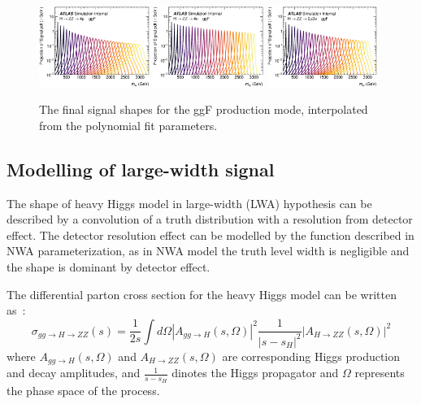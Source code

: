 \begin{figure}[htbp]
    \centering
    \includegraphics[width=0.32\textwidth]{figures/HMHZZ/signal/NWA//ggf_multipeakplot_4mu.eps}
    \includegraphics[width=0.32\textwidth]{figures/HMHZZ/signal/NWA//ggf_multipeakplot_4e.eps}
    \includegraphics[width=0.32\textwidth]{figures/HMHZZ/signal/NWA//ggf_multipeakplot_2mu2e.eps}
    \caption{The final signal shapes for the ggF production mode, interpolated from the polynomial fit parameters.}
    \label{fig:ggf_multipeak}
\end{figure}


\subsection{Modelling of large-width signal}
\label{sec:signal_lwa}

The \mfl shape of heavy Higgs model in large-width (LWA) hypothesis can be described by a convolution of a truth distribution with a resolution from detector effect.
The detector resolution effect can be modelled by the function described in NWA parameterization,
as in NWA model the truth level width is negligible and the shape is dominant by detector effect.

The differential parton cross section for the heavy Higgs model can be written as~\cite{Goria:2011wa}:
\begin{equation}
    \sigma_{gg \to H \to ZZ} (s) = \frac{1}{2s}  \int d \Omega \left | A_{gg \to H}(s,\Omega) \right |^2 \frac{1}{ \left | s - s_H \right |^2}  \left | A_{H \to ZZ}(s,\Omega) \right |^2
\end{equation}
where $A_{gg \to H}(s,\Omega)$ and $A_{H \to ZZ}(s,\Omega)$ are corresponding Higgs production and decay amplitudes,
and $\frac{1}{s - s_H}$ dinotes the Higgs propagator and $\Omega$ represents the phase space of the process.

